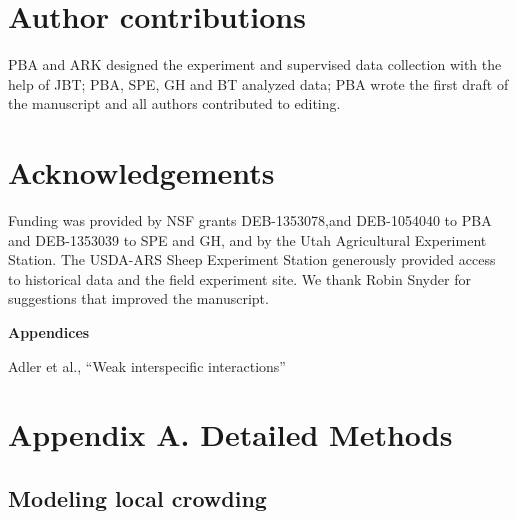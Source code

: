 \documentclass[11pt]{article}
\begin{document}
\begin{doublespacing}
\section*{Author contributions}

PBA and ARK designed the experiment and supervised data collection with the help of JBT; PBA, SPE, GH and BT analyzed data; PBA wrote the first draft of the manuscript and all authors contributed to editing.

\section*{Acknowledgements}

Funding was provided by NSF grants DEB-1353078,and  DEB-1054040 to PBA and DEB-1353039 to SPE and GH, and by the Utah Agricultural Experiment Station. The USDA-ARS Sheep Experiment Station generously provided access to historical data and the field experiment site.  We thank Robin Snyder for suggestions that improved the manuscript.





\end{doublespacing} 


\clearpage 
\newpage 

\setcounter{page}{1}
\setcounter{equation}{0}
\setcounter{figure}{0}
\setcounter{section}{0}
\setcounter{table}{0}
\renewcommand{\theequation}{A-\arabic{equation}}
\renewcommand{\thetable}{B-\arabic{table}}
\renewcommand{\thefigure}{C-\arabic{figure}}
\renewcommand{\thesection}{A.\arabic{section}}

\centerline{\Large \textbf{Appendices}}
\centerline{Adler et al., ``Weak interspecific interactions''} 

\vspace{0.4in} 

\section*{Appendix A. Detailed Methods} \label{suppMethods}

\subsection*{Modeling local crowding}
\end{document}
